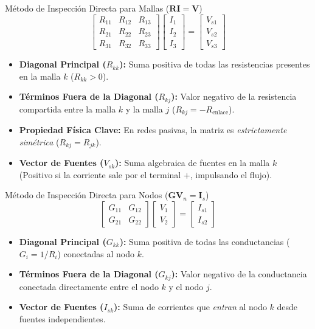 \documentclass[aspectratio=169, 10pt]{beamer}
\begin{document}
\begin{frame}{Método de Inspección Directa para Mallas ($\mathbf{R}\mathbf{I} = \mathbf{V}$)}
    $$
    \begin{bmatrix} R_{11} & R_{12} & R_{13} \\ R_{21} & R_{22} & R_{23} \\ R_{31} & R_{32} & R_{33} \end{bmatrix} 
    \begin{bmatrix} I_1 \\ I_2 \\ I_3 \end{bmatrix} = 
    \begin{bmatrix} V_{s1} \\ V_{s2} \\ V_{s3} \end{bmatrix}
    $$
    
    \begin{itemize}
        \item \textbf{Diagonal Principal ($R_{kk}$):} Suma positiva de todas las resistencias presentes en la malla $k$ ($R_{kk} > 0$).
        \item \textbf{Términos Fuera de la Diagonal ($R_{kj}$):} Valor negativo de la resistencia compartida entre la malla $k$ y la malla $j$ ($R_{kj} = -R_{\text{enlace}}$).
        \item \textbf{Propiedad Física Clave:} En redes pasivas, la matriz es \textit{estrictamente simétrica} ($R_{kj} = R_{jk}$).
        \item \textbf{Vector de Fuentes ($V_{sk}$):} Suma algebraica de fuentes en la malla $k$ (Positivo si la corriente sale por el terminal $+$, impulsando el flujo).
    \end{itemize}
\end{frame}

\begin{frame}{Método de Inspección Directa para Nodos ($\mathbf{G}\mathbf{V}_n = \mathbf{I}_s$)}
    $$
    \begin{bmatrix} G_{11} & G_{12} \\ G_{21} & G_{22} \end{bmatrix} 
    \begin{bmatrix} V_1 \\ V_2 \end{bmatrix} = 
    \begin{bmatrix} I_{s1} \\ I_{s2} \end{bmatrix}
    $$
    
    \begin{itemize}
        \item \textbf{Diagonal Principal ($G_{kk}$):} Suma positiva de todas las conductancias ($G_i = 1/R_i$) conectadas al nodo $k$.
        \item \textbf{Términos Fuera de la Diagonal ($G_{kj}$):} Valor negativo de la conductancia conectada directamente entre el nodo $k$ y el nodo $j$.
        \item \textbf{Vector de Fuentes ($I_{sk}$):} Suma de corrientes que \textit{entran} al nodo $k$ desde fuentes independientes.
    \end{itemize}
\end{frame}
\end{document}
